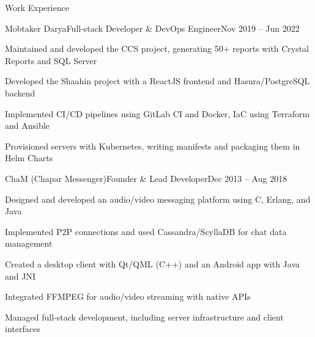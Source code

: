 \documentclass[]{main}
\begin{document}
\begin{section}{Work Experience}
 \begin{subsection}{Mobtaker Darya}{Full-stack Developer \& DevOps Engineer}{Nov 2019 -- Jun 2022}{}
     \item Maintained and developed the CCS project, generating 50+ reports with Crystal Reports and SQL Server
     \item Developed the Shaahin project with a ReactJS frontend and Hasura/PostgreSQL backend
     \item Implemented CI/CD pipelines using GitLab CI and Docker, IaC using Terraform and Ansible
     \item Provisioned servers with Kubernetes, writing manifests and packaging them in Helm Charts
 \end{subsection}

 \begin{subsection}{ChaM (Chapar Messenger)}{Founder \& Lead Developer}{Dec 2013 -- Aug 2018}{}
     \item Designed and developed an audio/video messaging platform using C, Erlang, and Java
     \item Implemented P2P connections and used Cassandra/ScyllaDB for chat data management
     \item Created a desktop client with Qt/QML (C++) and an Android app with Java and JNI
     \item Integrated FFMPEG for audio/video streaming with native APIs
     \item Managed full-stack development, including server infrastructure and client interfaces
 \end{subsection}
\end{section}

\end{document}
